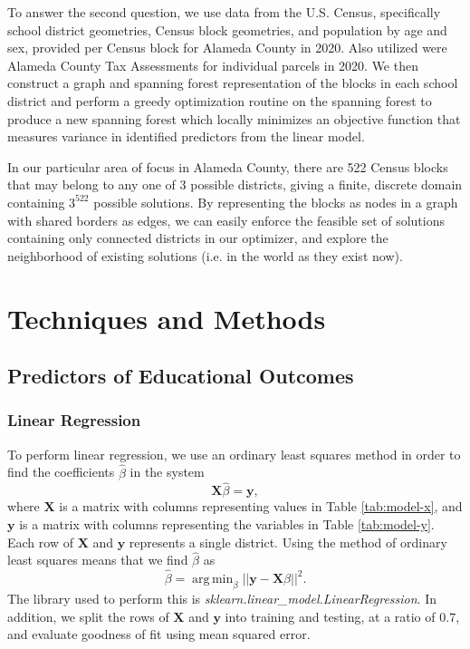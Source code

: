 \documentclass{article}
\DeclareMathOperator*{\argmin}{arg\,min}
\begin{document}
To answer the second question, we use data from the U.S. Census, specifically school district geometries, Census block geometries\autocite{censusblocks}, and population by age and sex\autocite{censusblockdata}, provided per Census block for Alameda County in 2020. Also utilized were Alameda County Tax Assessments\autocite{landvalue} for individual parcels in 2020. We then construct a graph and spanning forest representation of the blocks in each school district and perform a greedy optimization routine on the spanning forest to produce a new spanning forest which locally minimizes an objective function that measures variance in identified predictors from the linear model.

In our particular area of focus in Alameda County, there are 522 Census blocks that may belong to any one of 3 possible districts, giving a finite, discrete domain containing \(3^{522}\) possible solutions. By representing the blocks as nodes in a graph with shared borders as edges, we can easily enforce the feasible set of solutions containing only connected districts in our optimizer, and explore the neighborhood of existing solutions (i.e. in the world as they exist now).

\section{Techniques and Methods}
\subsection{Predictors of Educational Outcomes}\label{sec:model}
\subsubsection{Linear Regression}
To perform linear regression, we use an ordinary least squares method in order to find the coefficients \(\hat{\beta}\) in the system
\begin{equation*}
    \mathbf{X}\hat{\beta} = \mathbf{y},
\end{equation*}
where \(\mathbf{X}\) is a matrix with columns representing values in Table \ref{tab:model-x}, and \(\mathbf{y}\) is a matrix with columns representing the variables in Table \ref{tab:model-y}. Each row of \(\mathbf{X}\) and \(\mathbf{y}\) represents a single district. Using the method of ordinary least squares means that we find \(\hat{\beta}\) as 
\begin{equation*}
    \hat{\beta} = \argmin_{\beta}{\left|\left|\mathbf{y}-\mathbf{X}\beta\right|\right|^2}.
\end{equation*}
The library used to perform this is \textit{sklearn.linear\_model.LinearRegression}. In addition, we split the rows of \(\mathbf{X}\) and \(\mathbf{y}\) into training and testing, at a ratio of \(0.7\), and evaluate goodness of fit using mean squared error.
\end{document}
